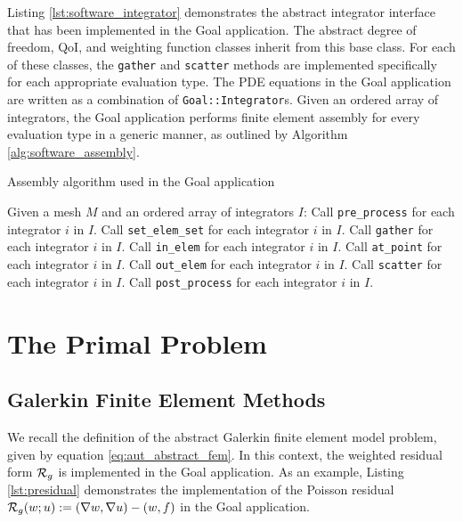 Listing \ref{lst:software_integrator} demonstrates the abstract
integrator interface that has been implemented in the Goal
application. The abstract degree of freedom, QoI, and
weighting function classes inherit from this base class.
For each of these classes, the \texttt{gather} and \texttt{scatter}
methods are implemented specifically for each appropriate
evaluation type. The PDE equations in the Goal application are
written as a combination of \texttt{Goal::Integrator}s.
Given  an ordered array of integrators, the Goal application
performs finite element assembly for every evaluation type
in a generic manner, as outlined by Algorithm \ref{alg:software_assembly}.

\begin{algorithm}
\caption{Assembly algorithm used in the Goal application}
\begin{algorithmic}
\State Given a mesh $M$ and an ordered array of integrators $I$:
\State Call \texttt{pre\_process} for each integrator $i$ in $I$.
\State Call \texttt{set\_elem\_set} for each integrator $i$ in $I$.
\State Call \texttt{gather} for each integrator $i$ in $I$.
\State Call \texttt{in\_elem} for each integrator $i$ in $I$.
\State Call \texttt{at\_point} for each integrator $i$ in $I$.
\EndFor
\State Call \texttt{out\_elem} for each integrator $i$ in $I$.
\State Call \texttt{scatter} for each integrator $i$ in $I$.
\EndFor
\EndFor
\State Call \texttt{post\_process} for each integrator $i$ in $I$.
\end{algorithmic}
\label{alg:software_assembly}
\end{algorithm}

\section{The Primal Problem}

\subsection{Galerkin Finite Element Methods}

We recall the definition of the abstract Galerkin finite element model
problem, given by equation \eqref{eq:aut_abstract_fem}. In this context,
the weighted residual form $\mathcal{R}_g$ is implemented in the Goal application.
As an example, Listing \ref{lst:presidual} demonstrates the implementation
of the Poisson residual $\mathcal{R}_g(w; u) := (\nabla w, \nabla u) - (w,f)$ in
the Goal application.

